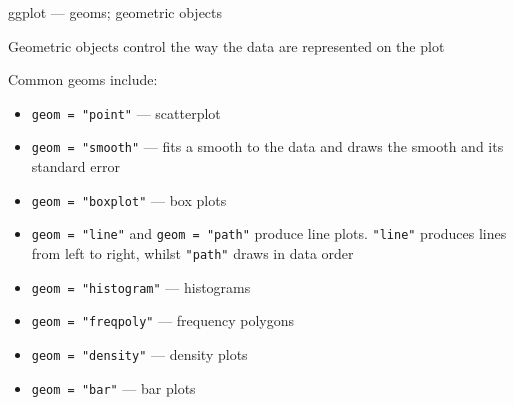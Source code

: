 \documentclass[10pt,ignorenonframetext,compress, aspectratio=169]{beamer}
\providecommand{\tightlist}{%
  \setlength{\itemsep}{0pt}\setlength{\parskip}{0pt}}
\begin{document}
\begin{frame}[fragile]{ggplot --- geoms; geometric objects}

Geometric objects control the way the data are represented on the plot

Common geoms include:

\begin{itemize}
\tightlist
\item
  \texttt{geom\ =\ "point"} --- scatterplot
\item
  \texttt{geom\ =\ "smooth"} --- fits a smooth to the data and draws the
  smooth and its standard error
\item
  \texttt{geom\ =\ "boxplot"} --- box plots
\item
  \texttt{geom\ =\ "line"} and \texttt{geom\ =\ "path"} produce line
  plots. \texttt{"line"} produces lines from left to right, whilst
  \texttt{"path"} draws in data order
\item
  \texttt{geom\ =\ "histogram"} --- histograms
\item
  \texttt{geom\ =\ "freqpoly"} --- frequency polygons
\item
  \texttt{geom\ =\ "density"} --- density plots
\item
  \texttt{geom\ =\ "bar"} --- bar plots
\end{itemize}

\end{frame}
\end{document}
